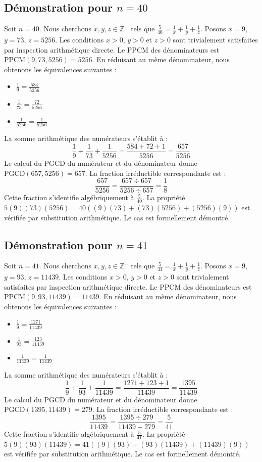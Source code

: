 \documentclass[12pt,a4paper]{article}
\begin{document}
\subsection{Démonstration pour $n = 40$}
Soit $n = 40$. Nous cherchons $x, y, z \in \mathbb{Z}^{+}$ tels que $\frac{5}{40} = \frac{1}{x} + \frac{1}{y} + \frac{1}{z}$.
Posons $x = 9$, $y = 73$, $z = 5256$.
Les conditions $x > 0$, $y > 0$ et $z > 0$ sont trivialement satisfaites par inspection arithmétique directe.
Le PPCM des dénominateurs est $\text{PPCM}(9, 73, 5256) = 5256$.
En réduisant au même dénominateur, nous obtenons les équivalences suivantes :
\begin{itemize}
    \item $\frac{1}{9} = \frac{584}{5256}$
    \item $\frac{1}{73} = \frac{72}{5256}$
    \item $\frac{1}{5256} = \frac{1}{5256}$
\end{itemize}
La somme arithmétique des numérateurs s'établit à :
$$ \frac{1}{9} + \frac{1}{73} + \frac{1}{5256} = \frac{584 + 72 + 1}{5256} = \frac{657}{5256} $$
Le calcul du PGCD du numérateur et du dénominateur donne $\text{PGCD}(657, 5256) = 657$.
La fraction irréductible correspondante est :
$$ \frac{657}{5256} = \frac{657 \div 657}{5256 \div 657} = \frac{1}{8} $$
Cette fraction s'identifie algébriquement à $\frac{5}{40}$.
La propriété $5(9)(73)(5256) = 40((9)(73) + (73)(5256) + (5256)(9))$ est vérifiée par substitution arithmétique.
Le cas est formellement démontré.

\subsection{Démonstration pour $n = 41$}
Soit $n = 41$. Nous cherchons $x, y, z \in \mathbb{Z}^{+}$ tels que $\frac{5}{41} = \frac{1}{x} + \frac{1}{y} + \frac{1}{z}$.
Posons $x = 9$, $y = 93$, $z = 11439$.
Les conditions $x > 0$, $y > 0$ et $z > 0$ sont trivialement satisfaites par inspection arithmétique directe.
Le PPCM des dénominateurs est $\text{PPCM}(9, 93, 11439) = 11439$.
En réduisant au même dénominateur, nous obtenons les équivalences suivantes :
\begin{itemize}
    \item $\frac{1}{9} = \frac{1271}{11439}$
    \item $\frac{1}{93} = \frac{123}{11439}$
    \item $\frac{1}{11439} = \frac{1}{11439}$
\end{itemize}
La somme arithmétique des numérateurs s'établit à :
$$ \frac{1}{9} + \frac{1}{93} + \frac{1}{11439} = \frac{1271 + 123 + 1}{11439} = \frac{1395}{11439} $$
Le calcul du PGCD du numérateur et du dénominateur donne $\text{PGCD}(1395, 11439) = 279$.
La fraction irréductible correspondante est :
$$ \frac{1395}{11439} = \frac{1395 \div 279}{11439 \div 279} = \frac{5}{41} $$
Cette fraction s'identifie algébriquement à $\frac{5}{41}$.
La propriété $5(9)(93)(11439) = 41((9)(93) + (93)(11439) + (11439)(9))$ est vérifiée par substitution arithmétique.
Le cas est formellement démontré.
\end{document}
